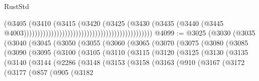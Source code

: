 \begin{lexlean}{RustStd}
\begin{coremodule}
{\begin{coremodule}
{{{{{{{{{{{{{{{{{{{{{{{{{{{{{{{{{{{{{{{{{{{{{{{{{{{{{{{                                                                                (@3405
                                                                                  (@3410
                                                                                    (@3415
                                                                                      (@3420
                                                                                        (@3425
                                                                                          (@3430
                                                                                            (@3435
                                                                                              (@3440
                                                                                                (@3445
                                                                                                  @4003)))))))))))))))))))))))))))))))))))))))))))))))
@4099 := @3025
    (@3030
      (@3035
        (@3040
          (@3045
            (@3050
              (@3055
                (@3060
                  (@3065
                    (@3070
                      (@3075
                        (@3080
                          (@3085
                            (@3090
                              (@3095
                                (@3100
                                  (@3105
                                    (@3110
                                      (@3115
                                        (@3120
                                          (@3125
                                            (@3130
                                              (@3135
                                                (@3140
                                                  (@3144
                                                    (@2286
                                                      (@3148
                                                        (@3153
                                                          (@3158
                                                            (@3163
                                                              (@910
                                                                (@3167
                                                                  (@3172
                                                                    (@3177
                                                                      (@857
                                                                        (@905
                                                                          (@3182
}}}}}}}}}}}}}}}}}}}}}}}}}}}}}}}}}}}}}}}}}}}}}}}}}}}}}}}
\end{coremodule}}
\end{coremodule}
\end{lexlean}
